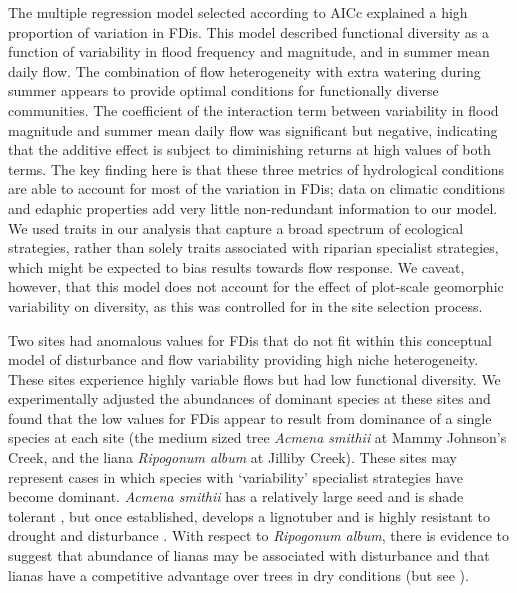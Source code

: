 The multiple regression model selected according to AICc explained a high proportion of variation in FDis. This model described functional diversity as a function of variability in flood frequency and magnitude, and in summer mean daily flow. The combination of flow heterogeneity with extra watering during summer appears to provide optimal conditions for functionally diverse communities. The coefficient of the interaction term between variability in flood magnitude and summer mean daily flow was significant but negative, indicating that the additive effect is subject to diminishing returns at high values of both terms. The key finding here is that these three metrics of hydrological conditions are able to account for most of the variation in FDis; data on climatic conditions and edaphic properties add very little non-redundant information to our model. We used traits in our analysis that capture a broad spectrum of ecological strategies, rather than solely traits associated with riparian specialist strategies, which might be expected to bias results towards flow response. We caveat, however, that this model does not account for the effect of plot-scale geomorphic variability on diversity, as this was controlled for in the site selection process.
 
Two sites had anomalous values for FDis that do not fit within this conceptual model of disturbance and flow variability providing high niche heterogeneity. These sites experience highly variable flows but had low functional diversity. We experimentally adjusted the abundances of dominant species at these sites and found that the low values for FDis appear to result from dominance of a single species at each site (the medium sized tree \textit{Acmena smithii} at Mammy Johnson’s Creek, and the liana \textit{Ripogonum album} at Jilliby Creek). These sites may represent cases in which species with ‘variability’ specialist strategies have become dominant. \textit{Acmena smithii} has a relatively large seed and is shade tolerant \citep{Melick1990}, but once established, develops a lignotuber and is highly resistant to drought and disturbance \citep{Ashton1976}. With respect to \textit{Ripogonum album}, there is evidence to suggest that abundance of lianas may be associated with disturbance \citep{Laurance2001} and that lianas have a competitive advantage over trees in dry conditions \citep{Swaine2007, Cai2009} (but see \citet{Nepstad2007}).
 
